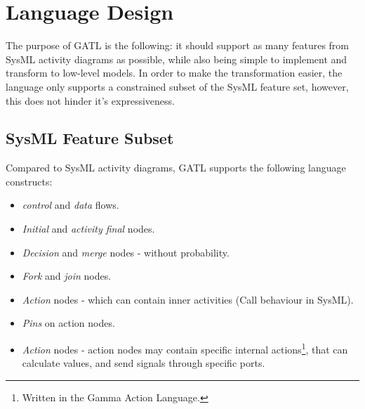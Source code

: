 \section{Language Design}

The purpose of GATL is the following: it should support as many features from SysML activity diagrams as possible, while also being simple to implement and transform to low-level models. In order to make the transformation easier, the language only supports a constrained subset of the SysML feature set, however, this does not hinder it's expressiveness.

\subsection{SysML Feature Subset}

Compared to SysML activity diagrams, GATL supports the following language constructs:

\begin{itemize}
	\item \emph{control} and \emph{data} flows.
	\item \emph{Initial} and \emph{activity final} nodes.
	\item \emph{Decision} and \emph{merge} nodes - without probability.
	\item \emph{Fork} and \emph{join} nodes.
	\item \emph{Action} nodes - which can contain inner activities (Call behaviour in SysML).
	\item \emph{Pins} on action nodes.
	\item \emph{Action} nodes - action nodes may contain specific internal actions\footnote{Written in the Gamma Action Language.}, that can calculate values, and send signals through specific ports.
\end{itemize}
